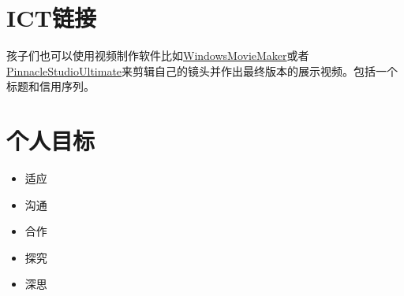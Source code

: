 \section{ICT链接}
    孩子们也可以使用视频制作软件比如\href{http://www.microsoft.com/}{WindowsMovieMaker}或者\href{http:}{PinnacleStudioUltimate}来剪辑自己的镜头并作出最终版本的展示视频。包括一个标题和信用序列。



\section{个人目标}
   \begin{itemize}
     \item 适应
     \item 沟通  
     \item 合作
     \item 探究
     \item 深思  
   \end{itemize}

